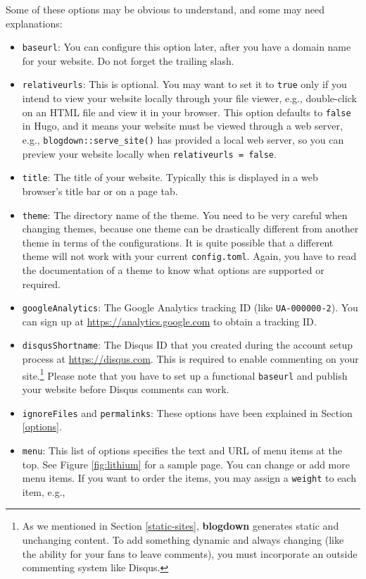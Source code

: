 \documentclass[12pt,]{krantz}
\theoremstyle{definition}
\theoremstyle{definition}
\theoremstyle{definition}
\theoremstyle{remark}
\begin{document}
Some of these options may be obvious to understand, and some may need
explanations:

\begin{itemize}
\item
  \texttt{baseurl}: You can configure this option later,
  after you have a domain name for your website. Do not forget the
  trailing slash.
\item
  \texttt{relativeurls}: This is optional. You may want to set it to
  \texttt{true} only if you intend to view your website locally through
  your file viewer, e.g., double-click on an HTML file and view it in
  your browser. This option defaults to \texttt{false} in Hugo, and it
  means your website must be viewed through a web server, e.g.,
  \texttt{blogdown::serve\_site()} has provided a local web server, so
  you can preview your website locally when
  \texttt{relativeurls\ =\ false}.
\item
  \texttt{title}: The title of your website. Typically this is displayed
  in a web browser's title bar or on a page tab.
\item
  \texttt{theme}: The directory name of the theme. You need to be very
  careful when changing themes, because one theme can be drastically
  different from another theme in terms of the configurations. It is
  quite possible that a different theme will not work with your current
  \texttt{config.toml}. Again, you have to read the documentation of a
  theme to know what options are supported or required.
\item
  \texttt{googleAnalytics}: The Google Analytics
  tracking ID (like \texttt{UA-000000-2}). You can sign up at
  \url{https://analytics.google.com} to obtain a tracking ID.
\item
  \texttt{disqusShortname}: The Disqus ID that
  you created during the account setup process at
  \url{https://disqus.com}. This is required to enable commenting on
  your site.\footnote{As we mentioned in Section \ref{static-sites},
    \textbf{blogdown} generates static and unchanging content. To add
    something dynamic and always changing (like the ability for your
    fans to leave comments), you must incorporate an outside commenting
    system like Disqus.} Please note that you have to set up a
  functional \texttt{baseurl} and publish your website before Disqus
  comments can work.
\item
  \texttt{ignoreFiles} and \texttt{permalinks}: These options have been
  explained in Section \ref{options}.
\item
  \texttt{menu}: This list of options specifies the text and URL of menu
  items at the top. See Figure \ref{fig:lithium} for a sample page. You
  can change or add more menu items. If you want to order the items, you
  may assign a \texttt{weight} to each item, e.g.,


\end{itemize}
\end{document}
